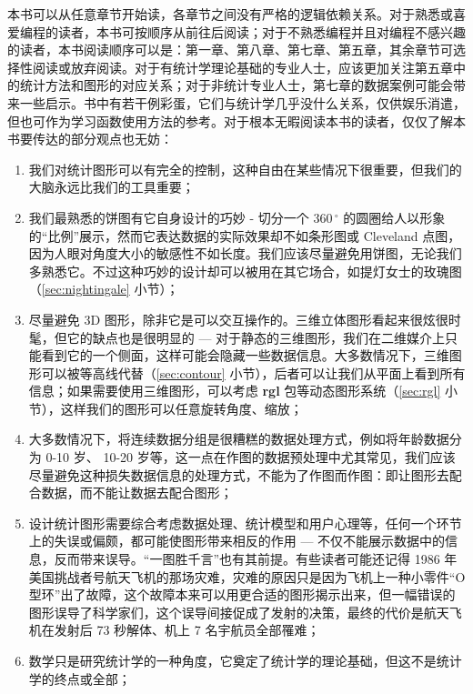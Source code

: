 \documentclass[
  b5paper,
  UTF8,twoside]{book}
\begin{document}
本书可以从任意章节开始读，各章节之间没有严格的逻辑依赖关系。对于熟悉或喜爱编程的读者，本书可按顺序从前往后阅读；对于不熟悉编程并且对编程不感兴趣的读者，本书阅读顺序可以是：第一章、第八章、第七章、第五章，其余章节可选择性阅读或放弃阅读。对于有统计学理论基础的专业人士，应该更加关注第五章中的统计方法和图形的对应关系；对于非统计专业人士，第七章的数据案例可能会带来一些启示。书中有若干例彩蛋，它们与统计学几乎没什么关系，仅供娱乐消遣，但也可作为学习函数使用方法的参考。对于根本无暇阅读本书的读者，仅仅了解本书要传达的部分观点也无妨：

\begin{enumerate}
\def\labelenumi{\arabic{enumi}.}
\item
  我们对统计图形可以有完全的控制，这种自由在某些情况下很重要，但我们的大脑永远比我们的工具重要；
\item
  我们最熟悉的饼图有它自身设计的巧妙 - 切分一个 \(360\,^{\circ}\) 的圆圈给人以形象的``比例''展示，然而它表达数据的实际效果却不如条形图或 Cleveland 点图，因为人眼对角度大小的敏感性不如长度。我们应该尽量避免用饼图，无论我们多熟悉它。不过这种巧妙的设计却可以被用在其它场合，如提灯女士的玫瑰图（\ref{sec:nightingale} 小节）；
\item
  尽量避免 3D 图形，除非它是可以交互操作的。三维立体图形看起来很炫很时髦，但它的缺点也是很明显的 --- 对于静态的三维图形，我们在二维媒介上只能看到它的一个侧面，这样可能会隐藏一些数据信息。大多数情况下，三维图形可以被等高线代替（\ref{sec:contour} 小节），后者可以让我们从平面上看到所有信息；如果需要使用三维图形，可以考虑 \textbf{rgl} 包等动态图形系统（\ref{sec:rgl} 小节），这样我们的图形可以任意旋转角度、缩放；
\item
  大多数情况下，将连续数据分组是很糟糕的数据处理方式，例如将年龄数据分为 0-10 岁、 10-20 岁等，这一点在作图的数据预处理中尤其常见，我们应该尽量避免这种损失数据信息的处理方式，不能为了作图而作图：即让图形去配合数据，而不能让数据去配合图形；
\item
  设计统计图形需要综合考虑数据处理、统计模型和用户心理等，任何一个环节上的失误或偏颇，都可能使图形带来相反的作用 --- 不仅不能展示数据中的信息，反而带来误导。``一图胜千言''也有其前提。有些读者可能还记得 1986 年美国挑战者号航天飞机的那场灾难，灾难的原因只是因为飞机上一种小零件``O 型环''出了故障，这个故障本来可以用更合适的图形揭示出来，但一幅错误的图形误导了科学家们，这个误导间接促成了发射的决策，最终的代价是航天飞机在发射后 73 秒解体、机上 7 名宇航员全部罹难；
\item
  数学只是研究统计学的一种角度，它奠定了统计学的理论基础，但这不是统计学的终点或全部；
\end{enumerate}
\end{document}
